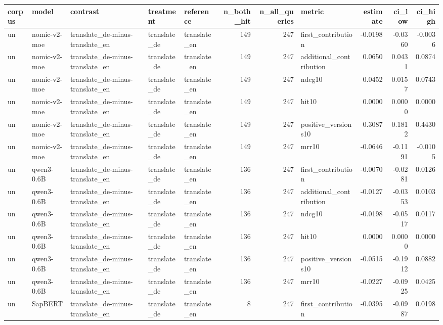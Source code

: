 \begin{tabular}{lllllrrlrrr}
\toprule
corpus & model & contrast & treatment & reference & n\_both\_hit & n\_all\_queries & metric & estimate & ci\_low & ci\_high \\
\midrule
un & nomic-v2-moe & translate\_de-minus-translate\_en & translate\_de & translate\_en & 149 & 247 & first\_contribution & -0.0198 & -0.0360 & -0.0036 \\
un & nomic-v2-moe & translate\_de-minus-translate\_en & translate\_de & translate\_en & 149 & 247 & additional\_contribution & 0.0650 & 0.0431 & 0.0874 \\
un & nomic-v2-moe & translate\_de-minus-translate\_en & translate\_de & translate\_en & 149 & 247 & ndcg10 & 0.0452 & 0.0157 & 0.0743 \\
un & nomic-v2-moe & translate\_de-minus-translate\_en & translate\_de & translate\_en & 149 & 247 & hit10 & 0.0000 & 0.0000 & 0.0000 \\
un & nomic-v2-moe & translate\_de-minus-translate\_en & translate\_de & translate\_en & 149 & 247 & positive\_versions10 & 0.3087 & 0.1812 & 0.4430 \\
un & nomic-v2-moe & translate\_de-minus-translate\_en & translate\_de & translate\_en & 149 & 247 & mrr10 & -0.0646 & -0.1191 & -0.0105 \\
un & qwen3-0.6B & translate\_de-minus-translate\_en & translate\_de & translate\_en & 136 & 247 & first\_contribution & -0.0070 & -0.0281 & 0.0126 \\
un & qwen3-0.6B & translate\_de-minus-translate\_en & translate\_de & translate\_en & 136 & 247 & additional\_contribution & -0.0127 & -0.0353 & 0.0103 \\
un & qwen3-0.6B & translate\_de-minus-translate\_en & translate\_de & translate\_en & 136 & 247 & ndcg10 & -0.0198 & -0.0517 & 0.0117 \\
un & qwen3-0.6B & translate\_de-minus-translate\_en & translate\_de & translate\_en & 136 & 247 & hit10 & 0.0000 & 0.0000 & 0.0000 \\
un & qwen3-0.6B & translate\_de-minus-translate\_en & translate\_de & translate\_en & 136 & 247 & positive\_versions10 & -0.0515 & -0.1912 & 0.0882 \\
un & qwen3-0.6B & translate\_de-minus-translate\_en & translate\_de & translate\_en & 136 & 247 & mrr10 & -0.0227 & -0.0925 & 0.0425 \\
un & SapBERT & translate\_de-minus-translate\_en & translate\_de & translate\_en & 8 & 247 & first\_contribution & -0.0395 & -0.0987 & 0.0198 \\

\end{tabular}
